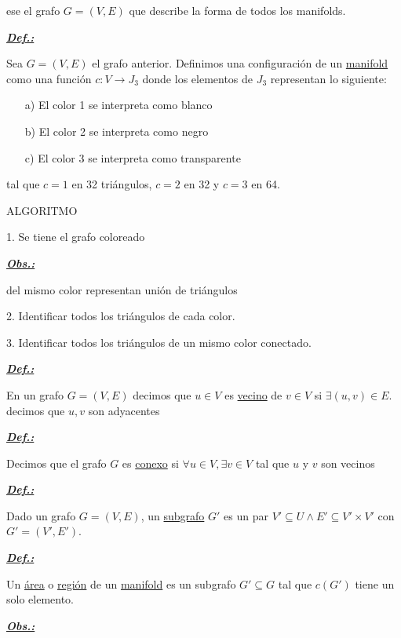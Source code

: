 \documentclass[a4paper, 10pt]{article}
\begin{document}
	ese el grafo $ G=(V,E) $ que describe la forma de todos los manifolds. 
	
	\textbf{\textit{\underline{Def.:}}}
	
	Sea $ G=(V,E) $ el grafo anterior. Definimos una configuración de un \underline{manifold} como una función $ c:V\longrightarrow J_3 $ donde los elementos de $ J_3 $ representan lo siguiente:
	\begin{itemize}
		\item [a)] El color 1 se interpreta como blanco
		
		\item [b)] El color 2 se interpreta como negro
		
		\item [c)] El color 3 se interpreta como transparente
	\end{itemize}
	
	tal que $ c=1 $ en 32 triángulos, $ c=2 $ en 32 y $ c=3 $ en 64. 
	
	\newpage
	ALGORITMO
	
	1. Se tiene el grafo coloreado
	
	\textbf{\textit{\underline{Obs.:}}}
	
	del mismo color representan unión de triángulos
	
	2. Identificar todos los triángulos de cada color.
	
	3. Identificar todos los triángulos de un mismo color conectado.
	
	\textbf{\textit{\underline{Def.:}}}
	
	En un grafo $ G=(V,E) $ decimos que $ u\in V $ es \underline{vecino} de $ v\in V $ si $ \exists(u,v)\in E $. decimos que $ u,v $ son adyacentes
	
	\textbf{\textit{\underline{Def.:}}}
	
	Decimos que el grafo $ G $ es \underline{conexo} si $ \forall u\in V, \exists v\in V $ tal que $ u $ y $ v $ son vecinos 
	
	\textbf{\textit{\underline{Def.:}}}
	
	Dado un grafo $ G=(V,E) $, un \underline{subgrafo} $ G' $ es un par $ V'\subseteq U \wedge E'\subseteq V' \times V' $ con $ G'=(V', E') $.
	
	\textbf{\textit{\underline{Def.:}}}
	
	Un \underline{área} o \underline{región} de un \underline{manifold} es un subgrafo  $ G'\subseteq G $ tal que $ c(G') $ tiene un solo elemento.
	
	\textbf{\textit{\underline{Obs.:}}}
	
\end{document}

